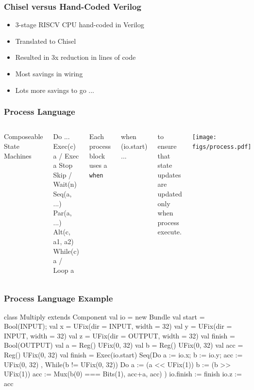 \documentclass[xcolor=pdflatex,dvipsnames,table]{beamer}
\begin{document}
\begin{frame}
\frametitle {Chisel versus Hand-Coded Verilog}

\begin{itemize}
\item 3-stage RISCV CPU hand-coded in Verilog
\item Translated to Chisel
\item Resulted in 3x reduction in lines of code
\item Most savings in wiring
\item Lots more savings to go ...
\end{itemize}

\end{frame}

\begin{frame}[fragile]
\frametitle{Process Language}

\begin{columns}


Composeable State Machines
\begin{scala}
Do{ ... }
Exec(c){ a } / Exec{ a }
Stop
Skip / Wait(n)
Seq(a, ...)
Par(a, ...)
Alt(c, a1, a2)
While(c){ a } / Loop{ a }
\end{scala}

Each process block uses a \verb+when+
\begin{scala}
when (io.start) { ... }
\end{scala}
to ensure that state updates are updated only when process execute.


\begin{center}
\texttt{[image: figs/process.pdf]} \\
\end{center}

\end{columns}

\end{frame}

\begin{frame}
\frametitle{Process Language Example}

\begin{scala}
class Multiply extends Component {
  val io = new Bundle{ 
    val start  = Bool(INPUT);
    val x      = UFix(dir = INPUT, width = 32)
    val y      = UFix(dir = INPUT, width = 32)
    val z      = UFix(dir = OUTPUT, width = 32)
    val finish = Bool(OUTPUT) }
  val a   = Reg(){ UFix(0, 32) }
  val b   = Reg(){ UFix(0, 32) }
  val acc = Reg(){ UFix(0, 32) }
  val finish =
    Exec(io.start) {
      Seq(Do{ a := io.x; b := io.y; acc := UFix(0, 32) },
          While(b != UFix(0, 32)) {
            Do{ a   := (a << UFix(1)) 
                b   := (b >> UFix(1))
                acc := Mux(b(0) === Bits(1), acc+a, acc) } })
    }
  io.finish  := finish
  io.z       := acc
}
\end{scala}

\end{frame}
\end{document}
